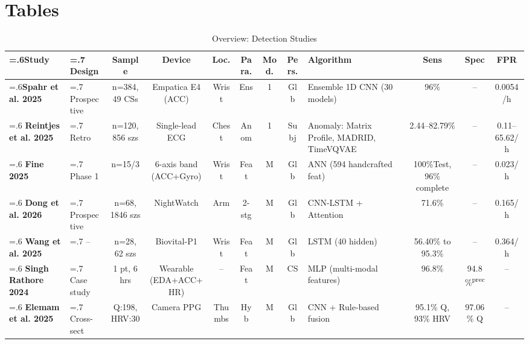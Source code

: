 \section{Tables}
\begin{landscape}
\begin{table}[htbp]
\centering
\scriptsize
\caption{Overview: Detection Studies}
\label{tab:detection-matrix}
\setlength{\tabcolsep}{2.5pt}
\renewcommand{\arraystretch}{1.15}
\begin{tabularx}{\linewidth}{@{} >{\hsize=.6\hsize}X >{\hsize=.7\hsize}X c c c c c c >{\hsize=1.1\hsize}X c c c @{}}
\toprule
\textbf{Study} & \textbf{Design} & \textbf{Sample} & \textbf{Device} & \textbf{Loc.} & \textbf{Para.} & \textbf{Mod.} & \textbf{Pers.} & \textbf{Algorithm} & \textbf{Sens} & \textbf{Spec} & \textbf{FPR} \\
\midrule
\textbf{Spahr et al. 2025} & Prospective & n=384, 49 CSs & Empatica E4 (ACC) & Wrist & Ens & 1 & Glb & Ensemble 1D CNN (30 models) & 96\% & -- & 0.0054/h \\
\addlinespace
\textbf{Reintjes et al. 2025} & Retro & n=120, 856 szs & Single-lead ECG & Chest & Anom & 1 & Subj & Anomaly: Matrix Profile, MADRID, TimeVQVAE & 2.44--82.79\% & -- & 0.11--65.62/h \\
\addlinespace
\textbf{Fine 2025} & Phase 1 & n=15/3 & 6-axis band (ACC+Gyro) & Wrist & Feat & M & Glb & ANN (594 handcrafted feat) & 100\%Test, 96\% complete & -- & 0.023/h \\
\addlinespace
\textbf{Dong et al. 2026} & Prospective & n=68, 1846 szs & NightWatch & Arm & 2-stg & M & Glb & CNN-LSTM + Attention & 71.6\% & -- & 0.165/h \\
\addlinespace
\textbf{Wang et al. 2025} & -- & n=28, 62 szs & Biovital-P1 & Wrist & Feat & M & Glb & LSTM (40 hidden) & 56.40\% to 95.3\% & -- & 0.364/h \\
\addlinespace
\textbf{Singh Rathore 2024} & Case study & 1 pt, 6 hrs & Wearable (EDA+ACC+HR) & -- & Feat & M & CS & MLP (multi-modal features) & 96.8\% & 94.8\%\textsuperscript{prec} & -- \\
\addlinespace
\textbf{Elemam et al. 2025} & Cross-sect & Q:198, HRV:30 & Camera PPG & Thumbs & Hyb & M & Glb & CNN + Rule-based fusion & 95.1\% Q, 93\% HRV & 97.06\% Q & -- \\

\end{tabularx}
\end{table}
\end{landscape}
